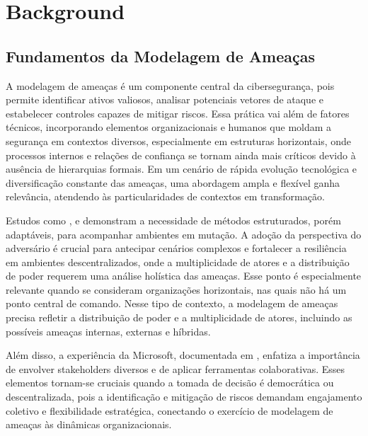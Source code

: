 
%

\chapter{Background} \label{cha:background}

\glsresetall

\section{Fundamentos da Modelagem de Ameaças}
\label{sec:fundamentos_da_modelagem_de_ameacas}

A modelagem de ameaças é um componente central da cibersegurança, pois
permite identificar ativos valiosos, analisar potenciais vetores de
ataque e estabelecer controles capazes de mitigar riscos. Essa prática
vai além de fatores técnicos, incorporando elementos organizacionais e
humanos que moldam a segurança em contextos diversos, especialmente em
estruturas horizontais, onde processos internos e relações de confiança
se tornam ainda mais críticos devido à ausência de hierarquias formais.
Em um cenário de rápida evolução tecnológica e diversificação constante
das ameaças, uma abordagem ampla e flexível ganha relevância, atendendo
às particularidades de contextos em transformação.

Estudos como \cite{ThreatModelingAsABasisForSecurityRequirements},
\cite{AdvancedThreatModeling} e
\cite{DemystifyingTheThreatModelingProcess} demonstram a necessidade
de métodos estruturados, porém adaptáveis, para acompanhar ambientes
em mutação. A adoção da perspectiva do adversário \cite{AHybridThreatModelingMethod}
é crucial para antecipar cenários complexos e fortalecer a resiliência
em ambientes descentralizados, onde a multiplicidade de atores e a
distribuição de poder requerem uma análise holística das ameaças.
Esse ponto é especialmente relevante quando se consideram organizações
horizontais, nas quais não há um ponto central de comando.
Nesse tipo de contexto, a modelagem de ameaças precisa refletir
a distribuição de poder e a multiplicidade de atores, incluindo as
possíveis ameaças internas, externas e híbridas.

Além disso, a experiência da Microsoft, documentada em
\cite{ExperiencesThreatModelingAtMicrosoft}, enfatiza a importância de
envolver stakeholders diversos e de aplicar ferramentas colaborativas.
Esses elementos tornam-se cruciais quando a tomada de decisão é
democrática ou descentralizada, pois a identificação e mitigação de
riscos demandam engajamento coletivo e flexibilidade estratégica,
conectando o exercício de modelagem de ameaças às dinâmicas
organizacionais.

